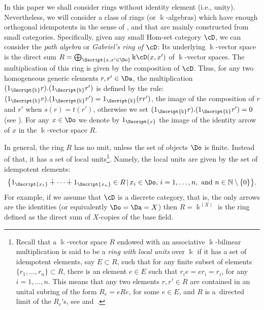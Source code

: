  In this paper we shall consider rings without identity element (i.e., unity). Nevertheless, we will consider a class of rings (or $\Bbbk$-algebras) which have enough orthogonal idempotents in the sense of \cite{Fuller:1976, Gabriel:1962}, and that are mainly constructed from small categories. Specifically, given any small Hom-set category $\cD$, we can consider the \emph{path algebra} or \emph{Gabriel's ring of $\cD$}: Its underlying $\Bbbk$-vector space is the direct sum $R=\bigoplus_{\Sscript{x, x' \in \Do}} \Bbbk \cD(x,x')$ of $\Bbbk$-vector spaces. The multiplication of this ring is given by
the composition of $\cD$. Thus, for any two homogeneous generic elements $r, r' \in \Da$, the multiplication $(1_{\Sscript{\Bbbk}}r) . (1_{\Sscript{\Bbbk}}r')$ is defined by the rule: $ (1_{\Sscript{\Bbbk}}r) . (1_{\Sscript{\Bbbk}}r') =1_{\Sscript{\Bbbk}} (r r') $, the image of the composition of $r$ and $r'$ when $s(r)=t(r')$, otherwise we set $ (1_{\Sscript{\Bbbk}}r) . (1_{\Sscript{\Bbbk}}r') =0$ (see \cite[p.~346]{Gabriel:1962}). For any $x \in \Do$ we denote by $1_{\Sscript{x}}$ the image of the identity arrow of $x$ in the $\Bbbk$-vector space $R$.

In general, the ring $R$ has no unit, unless the set of objects $\Do$ is finite. Instead of that, it has a set of local units\footnote{Recall that a $\Bbbk$-vector space $R$ endowed with an associative $\Bbbk$-bilinear multiplication is said to be a \emph{ring with local units} over $\Bbbk$ if it has a set of idempotent elements, say $E \subset R$, such that for any finite subset of elements $\{r_1, \dots,r_n\} \subset R$, there is an element $e \in E$ such that $r_ie=er_i=r_i$, for any $i=1,\dots,n$. This means that any two elements $r, r' \in R$ are contained in an unital subring of the form $R_e=eRe$, for some $e \in E$, and $R$ is a~directed limit of the $R_e$'s, see \cite{Abrams:1983, Anh/Marki:1983, Anh/Marki:1987} and~\cite{ElKaoutit:2009}.}. Namely, the local units are given by the set of idempotent elements:
\begin{gather*}
\big\{1_{\Sscript{x_1}} \dotplus \cdots \dotplus 1_{\Sscript{x_n}}\in R \,|\, x_i \in\Do,\, i=1,\dots, n, \text{ and } n \in \mathbb{N}\setminus\{0\}\big\}.
\end{gather*}
For example, if we assume that $\cD$ is a discrete category, that is, the only arrows are the identities (or equivalently $\Do=\Da=X$) then $R=\Bbbk^{(X)}$ is the ring defined as the direct sum of $X$-copies of the base field.


